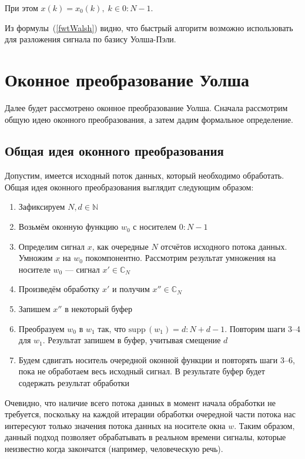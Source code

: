 \documentclass{matmex-diploma-custom}
\begin{document}
При этом $x(k) = x_0(k), \; k \in 0: N-1$.

Из формулы~(\ref{fwtWalsh}) видно, что быстрый алгоритм возможно использовать
для разложения сигнала по базису Уолша-Пэли.



\section{Оконное преобразование Уолша}
Далее будет рассмотрено оконное преобразование Уолша. Сначала рассмотрим общую
идею оконного преобразования, а затем дадим формальное определение.




\subsection{Общая идея оконного преобразования}
Допустим, имеется исходный поток данных, который необходимо обработать.
Общая идея оконного преобразования выглядит следующим образом:

\begin{enumerate}
  \item Зафиксируем $N, d \in \mathbb{N}$
  \item Возьмём оконную функцию $w_0$ с носителем $0:N-1$
  \item Определим сигнал $x$, как очередные $N$ отсчётов
    исходного потока данных. Умножим $x$ на $w_0$ покомпонентно. 
    Рассмотрим результат умножения
    на носителе $w_0$ ---  сигнал $x' \in \mathbb{C}_N$
  \item Произведём обработку $x'$ и получим $x'' \in \mathbb{C}_N$
  \item Запишем $x''$ в некоторый буфер
  \item Преобразуем $w_0$ в $w_1$ так, что $\mathrm{supp}\,(w_1) = d:N+d-1$. 
    Повторим шаги 3--4 для $w_1$. Результат запишем в буфер, учитывая смещение $d$
  \item Будем сдвигать носитель очередной оконной функции и 
    повторять шаги 3--6, пока не обработаем весь исходный сигнал. В результате 
    буфер будет содержать результат обработки
\end{enumerate}

Очевидно, что наличие всего потока данных в момент начала обработки
не требуется, поскольку на каждой итерации обработки очередной части потока нас интересуют
только значения потока данных на носителе окна $w$. Таким образом, данный подход позволяет
обрабатывать в реальном времени сигналы, которые неизвестно когда закончатся (например,
человеческую речь).
\end{document}
